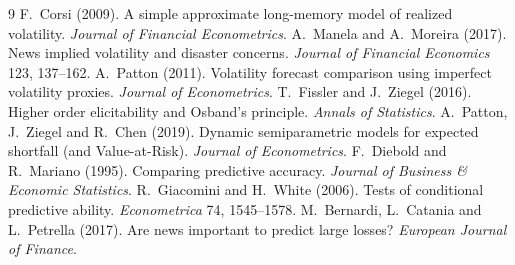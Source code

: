 \documentclass[11pt,a4paper]{article}
\begin{document}
\begin{thebibliography}{9}\small
{} F.~Corsi (2009). A simple approximate long-memory model of realized volatility. \emph{Journal of Financial Econometrics}.
 A.~Manela and A.~Moreira (2017). News implied volatility and disaster concerns. \emph{Journal of Financial Economics} 123, 137--162.
 A.~Patton (2011). Volatility forecast comparison using imperfect volatility proxies. \emph{Journal of Econometrics}.
 T.~Fissler and J.~Ziegel (2016). Higher order elicitability and Osband's principle. \emph{Annals of Statistics}.
 A.~Patton, J.~Ziegel and R.~Chen (2019). Dynamic semiparametric models for expected shortfall (and Value-at-Risk). \emph{Journal of Econometrics}.
 F.~Diebold and R.~Mariano (1995). Comparing predictive accuracy. \emph{Journal of Business \& Economic Statistics}.
 R.~Giacomini and H.~White (2006). Tests of conditional predictive ability. \emph{Econometrica} 74, 1545--1578.
 M.~Bernardi, L.~Catania and L.~Petrella (2017). Are news important to predict large losses? \emph{European Journal of Finance}.
\end{thebibliography}
\end{document}
